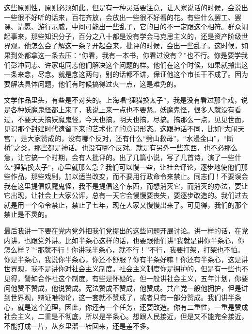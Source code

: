 这些原则性，原则必须如此。但是有一种灵活要注意，让人家说话的时候，会说出一些很不好听的话来，百花齐放，会放出一些很不好看的花。有些什么罢工、罢课、请愿、游行示威，中间可能出一些乱子，它的目的不一定跟这个相符。群众闹起事来，那些知识分子，百分之八十都是没有学会马克思主义的，还是资产阶级世界观，他怎么会了解这一条？开起会来，批评的时候，会出一些乱子。这时候，如果到处都拿这一条去压：“你看，我有一本书，你看过没有？”也不行。你是要学我们彭冲同志、许家屯同志他们解决这个问题的样。他们在这个时候，如果就搬出这一条来念，尽念。就是念这两句，别的话都不讲，保证他这个市长干不成了。因为要解决具体问题，他们有时候搞得过火一点，这是难免的。

文学作品里头，有些是不对头的。上海唱“狸猫换太子”，我是没有看过那个戏，说是各种妖魔鬼怪都上来了，我说上来一点也不要紧。妖魔鬼怪，很多人就没有看过，不要天天搞妖魔鬼怪，今天也搞，明天也搞，尽搞。搞那么一点，见见世面，见识那个封建时代遗留下来的艺术化了的意识形态。这跟神话不同，比如“大闹天宫”，是大家赞成的，没有哪个反对，还有什么“劈山救母”，“水漫金山”，“断桥”之类，那些都是神话。也没有哪个反对。就是有另外一些东西，也不必那么急，让它搞一个时期，会有人批评的。出了几篇小说，写了几首诗，演了一些什么“狸猫换太子”，心里就那么急？我们可以慢一些，让社会评论，逐步地使他们那些作品，那些戏剧，加以适当改变，而不要用行政命令来禁止。同志们！不要误会我在这里提倡妖魔鬼怪，我不是提倡这个东西，而想消灭它，而消灭的办法，要让它出现，让社会上大家公评，总有一天它会慢慢要丧失，要逐步改造的。我们过去就是用一个命令禁止，禁止了七年，现在人家又慢慢出来了。可见得，我们的那个禁止是不灵的。

最后我讲一下要在党内党外把我们党提出的这些问题开展讨论。讲一样的话，在党内讲，也跟党外讲。比如半条心这样的话，也要跟他们讲“我就是讲你半条心，你怎么样？”“那就不行！你讲我半条心，就不行！”不行，我要打架，打架也不怕。你是半条心，我说你半条心，你还不舒服？你有半条好嘛！你还有半条心，这是讲世界观，我不是讲你对社会主义制度。社会主义制度你是拥护的，但是有一些也不见得，譬如合作社这个制度，有些是怀疑的。但一般讲社会主义，五年计划，你要问他赞不赞成，他说赞成。宪法赞成不赞成，他赞成。共产党一般他拥护，但是讲到世界观，辩证唯物论，这一套就不赞成了，或者只有一部分赞成。我们讲半条心，就是这个道理，因此，你还有一个任务，还要改造。你有二重性，一重是赞成社会主义，二重是不彻底，所以是半条心。想跟人民接近，但是又不能完全接近，不能打成一片，从乡里溜一转回来，还是差不多。

